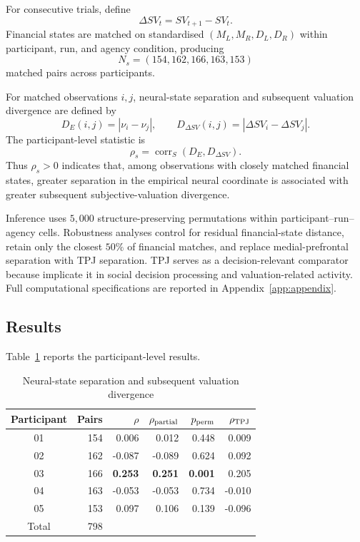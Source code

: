 \documentclass[graybox,natbib]{SNmult}
\providecommand{\1}{}
\renewcommand{\1}{\mathbbm 1}
\begin{document}
For consecutive trials, define
\[
\Delta SV_t=SV_{t+1}-SV_t.
\]
Financial states are matched on standardised
\((M_L,M_R,D_L,D_R)\) within participant, run, and agency condition, producing
\[
N_s=(154,162,166,163,153)
\]
matched pairs across participants.

For matched observations \(i,j\), neural-state separation and subsequent
valuation divergence are defined by
\[
D_E(i,j)=|\nu_i-\nu_j|,
\qquad
D_{\Delta SV}(i,j)=|\Delta SV_i-\Delta SV_j|.
\]
The participant-level statistic is
\[
\rho_s
=
\operatorname{corr}_S
\left(D_E,D_{\Delta SV}\right).
\]
Thus \(\rho_s>0\) indicates that, among observations with closely matched
financial states, greater separation in the empirical neural coordinate is
associated with greater subsequent subjective-valuation divergence.

Inference uses \(5{,}000\) structure-preserving permutations within
participant--run--agency cells. Robustness analyses control for residual
financial-state distance, retain only the closest \(50\%\) of financial
matches, and replace medial-prefrontal separation with TPJ separation.
TPJ serves as a decision-relevant comparator because \citet{PivaEtAl2019}
implicate it in social decision processing and valuation-related activity.
Full computational specifications are reported in
Appendix~\ref{app:appendix}.


\subsection{Results}
\label{subsec:empirical-results}

Table~\ref{tab:empirical-main} reports the participant-level results.

\begin{table}[t]
\centering
\caption{Neural-state separation and subsequent valuation divergence}
\label{tab:empirical-main}
\small
\begin{tabular}{crrrrr}
\toprule
Participant & Pairs & \(\rho\) & \(\rho_{\rm partial}\) &
\(p_{\rm perm}\) & \(\rho_{\rm TPJ}\) \\
\midrule
01 & 154 &  0.006 &  0.012 & 0.448 &  0.009 \\
02 & 162 & -0.087 & -0.089 & 0.624 &  0.092 \\
03 & 166 & \textbf{0.253} & \textbf{0.251} &
\textbf{0.001} & 0.205 \\
04 & 163 & -0.053 & -0.053 & 0.734 & -0.010 \\
05 & 153 &  0.097 &  0.106 & 0.139 & -0.096 \\
\midrule
Total & 798 & & & & \\
\bottomrule
\end{tabular}
\end{table}
\end{document}
